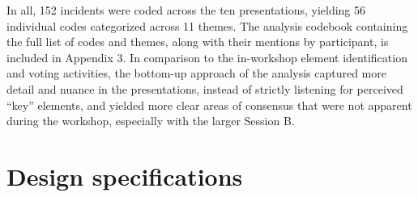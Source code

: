 \documentclass[letterpaper, 12pt]{article}
\begin{document}


In all, 152 incidents were coded across the ten presentations, yielding 56 individual codes categorized across 11 themes. The analysis codebook containing the full list of codes and themes, along with their mentions by participant, is included in Appendix 3. In comparison to the in-workshop element identification and voting activities, the bottom-up approach of the analysis captured more detail and nuance in the presentations, instead of strictly listening for perceived ``key'' elements, and yielded more clear areas of consensus that were not apparent during the workshop, especially with the larger Session B.

\section{Design specifications}
\label{sec:design-specifications}
\end{document}
